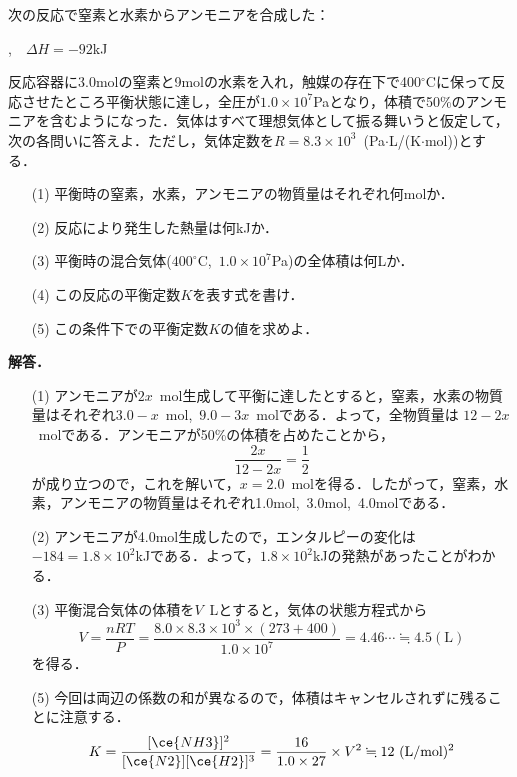 \documentclass[a4paper,11pt]{ltjsarticle}
\begin{document}
\begin{que}%
次の反応で窒素と水素からアンモニアを合成した：\\
\centerline{,~~$\varDelta H=-92$kJ}
反応容器に3.0molの窒素と9molの水素を入れ，触媒の存在下で400$^\circ$Cに保って反応させたところ平衡状態に達し，全圧が$1.0\times 10^7$Paとなり，体積で50$\%$のアンモニアを含むようになった．気体はすべて理想気体として振る舞いうと仮定して，次の各問いに答えよ．ただし，気体定数を$R=8.3\times 10^3$~(Pa$\cdot$L/(K$\cdot$mol))とする．
\begin{itemize}
    \item [(1)]平衡時の窒素，水素，アンモニアの物質量はそれぞれ何molか．
    \item [(2)]反応により発生した熱量は何kJか．
    \item [(3)]平衡時の混合気体($400^\circ$C,~$1.0\times 10^7$Pa)の全体積は何Lか．
    \item [(4)]この反応の平衡定数$K$を表す式を書け．
    \item [(5)]この条件下での平衡定数$K$の値を求めよ．
\end{itemize}
\end{que}
\noindent \textbf{解答．}
\begin{itemize}
    \item [(1)]アンモニアが$2x$~mol生成して平衡に達したとすると，窒素，水素の物質量はそれぞれ$3.0-x$~mol,~$9.0-3x$~molである．よって，全物質量は
    $12-2x$~molである．アンモニアが50$\%$の体積を占めたことから，
    \[\frac{2x}{12-2x}=\frac12\]
    が成り立つので，これを解いて，$x=2.0$~molを得る．したがって，窒素，水素，アンモニアの物質量はそれぞれ1.0mol,~3.0mol,~4.0molである．
    \item[(2)]アンモニアが4.0mol生成したので，エンタルピーの変化は$-184=1.8\times 10^2$kJである．よって，$1.8\times 10^2$kJの発熱があったことがわかる．
    \item[(3)]平衡混合気体の体積を$V$~Lとすると，気体の状態方程式から
    \[V=\frac{nRT}{P}=\frac{8.0\times 8.3\times 10^3\times(273+400)}{1.0\times10^7}=4.46\cdots\fallingdotseq 4.5(\text{L})\]
    を得る．
    \item[(5)]今回は両辺の係数の和が異なるので，体積はキャンセルされずに残ることに注意する．
    \[K=\frac{[\ce{NH3}]^2}{[\ce{N2}][\ce{H2}]^3}=\frac{16}{1.0\times 27}\times V^2\fallingdotseq 12~(\text{L/mol})^2\]
\end{itemize}
\end{document}
